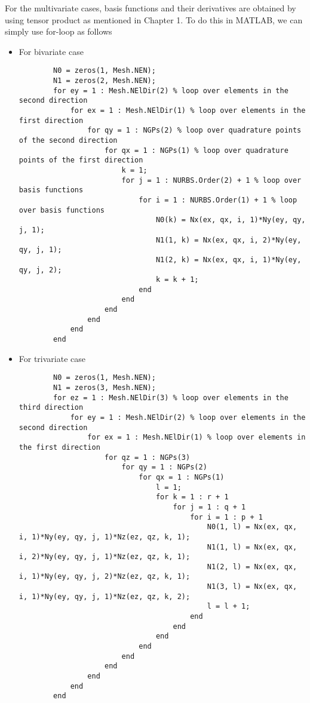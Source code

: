 For the multivariate cases, basis functions and their derivatives are obtained by using tensor product as mentioned in Chapter 1. To do this in MATLAB, we can simply use for-loop as follows
\begin{itemize}
    \item For bivariate case
    \begin{lstlisting}
        N0 = zeros(1, Mesh.NEN);
        N1 = zeros(2, Mesh.NEN);
        for ey = 1 : Mesh.NElDir(2) % loop over elements in the second direction
            for ex = 1 : Mesh.NElDir(1) % loop over elements in the first direction
                for qy = 1 : NGPs(2) % loop over quadrature points of the second direction
                    for qx = 1 : NGPs(1) % loop over quadrature points of the first direction
                        k = 1;
                        for j = 1 : NURBS.Order(2) + 1 % loop over basis functions
                            for i = 1 : NURBS.Order(1) + 1 % loop over basis functions
                                N0(k) = Nx(ex, qx, i, 1)*Ny(ey, qy, j, 1);
                                N1(1, k) = Nx(ex, qx, i, 2)*Ny(ey, qy, j, 1);
                                N1(2, k) = Nx(ex, qx, i, 1)*Ny(ey, qy, j, 2);
                                k = k + 1;
                            end
                        end
                    end
                end
            end
        end
    \end{lstlisting}
    \item For trivariate case
    \begin{lstlisting}
        N0 = zeros(1, Mesh.NEN);
        N1 = zeros(3, Mesh.NEN);
        for ez = 1 : Mesh.NElDir(3) % loop over elements in the third direction
            for ey = 1 : Mesh.NElDir(2) % loop over elements in the second direction
                for ex = 1 : Mesh.NElDir(1) % loop over elements in the first direction
                    for qz = 1 : NGPs(3)
                        for qy = 1 : NGPs(2)
                            for qx = 1 : NGPs(1)
                                l = 1;
                                for k = 1 : r + 1
                                    for j = 1 : q + 1
                                        for i = 1 : p + 1
                                            N0(1, l) = Nx(ex, qx, i, 1)*Ny(ey, qy, j, 1)*Nz(ez, qz, k, 1);
                                            N1(1, l) = Nx(ex, qx, i, 2)*Ny(ey, qy, j, 1)*Nz(ez, qz, k, 1);
                                            N1(2, l) = Nx(ex, qx, i, 1)*Ny(ey, qy, j, 2)*Nz(ez, qz, k, 1);
                                            N1(3, l) = Nx(ex, qx, i, 1)*Ny(ey, qy, j, 1)*Nz(ez, qz, k, 2);
                                            l = l + 1;
                                        end
                                    end
                                end
                            end
                        end
                    end
                end
            end
        end
    \end{lstlisting}
\end{itemize}
